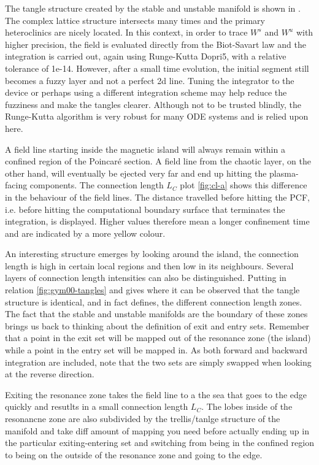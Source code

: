 The tangle structure created by the stable and unstable manifold is shown in . The complex lattice structure intersects many times and the primary heteroclinics are nicely located. In this context, in order to trace $W^s$ and $W^u$ with higher precision, the field is evaluated directly from the Biot-Savart law and the integration is carried out, again using Runge-Kutta Dopri5, with a relative tolerance of 1e-14. However, after a small time evolution, the initial segment still becomes a fuzzy layer and not a perfect 2d line. Tuning the integrator to the device or perhaps using a different integration scheme may help reduce the fuzziness and make the tangles clearer. Although not to be trusted blindly, the Runge-Kutta algorithm is very robust for many ODE systems and is relied upon here.

A field line starting inside the magnetic island will always remain within a confined region of the Poincaré section. A field line from the chaotic layer, on the other hand, will eventually be ejected very far and end up hitting the plasma-facing components. The connection length $L_C$ plot \ref{fig:cl-a} shows this difference in the behaviour of the field lines. The distance travelled before hitting the PCF, i.e. before hitting the computational boundary surface that terminates the integration, is displayed. Higher values therefore mean a longer confinement time and are indicated by a more yellow colour.

An interesting structure emerges by looking around the island, the connection length is high in certain local regions and then low in its neighbours. Several layers of connection length intensities can also be distinguished. Putting in relation \ref{fig:gym00-tangles} and  gives  where it can be observed that the tangle structure is identical, and in fact defines, the different connection length zones. The fact that the stable and unstable manifolds are the boundary of these zones brings us back to thinking about the definition of exit and entry sets. Remember that a point in the exit set will be mapped out of the resonance zone (the island) while a point in the entry set will be mapped in. As both forward and backward integration are included, note that the two sets are simply swapped when looking at the reverse direction. 

Exiting the resonance zone takes the field line to a the sea that goes to the edge quickly and resutlts in a small connection length $L_C$. The lobes inside of the resonancne zone are also subdivided by the trellis/tanlge structure of the manifold and take diff amount of mapping you need before actually ending up in the particular exiting-entering set and switching from being in the confined region to being on the outside of the resonance zone and going to the edge.

